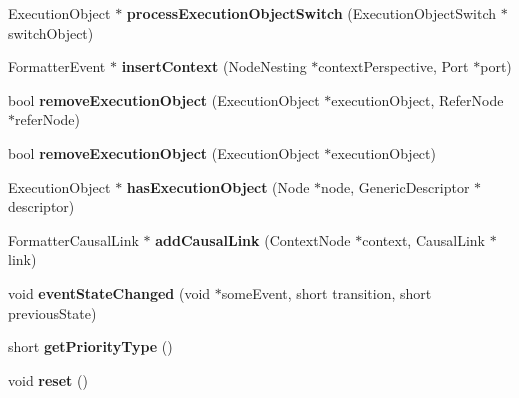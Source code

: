 \begin{CompactItemize}
\item 
ExecutionObject $\ast$ \textbf{processExecutionObjectSwitch} (ExecutionObjectSwitch $\ast$switchObject)\label{classbr_1_1pucrio_1_1telemidia_1_1ginga_1_1ncl_1_1emconverter_1_1FormatterConverter_7266d8edd850ca9ae602ddd7e01e663c}

\item 
FormatterEvent $\ast$ \textbf{insertContext} (NodeNesting $\ast$contextPerspective, Port $\ast$port)\label{classbr_1_1pucrio_1_1telemidia_1_1ginga_1_1ncl_1_1emconverter_1_1FormatterConverter_6542792f04ee69e171c20d9d40a5a04e}

\item 
bool \textbf{removeExecutionObject} (ExecutionObject $\ast$executionObject, ReferNode $\ast$referNode)\label{classbr_1_1pucrio_1_1telemidia_1_1ginga_1_1ncl_1_1emconverter_1_1FormatterConverter_9be863f5cf21361309d32df7de6aa49e}

\item 
bool \textbf{removeExecutionObject} (ExecutionObject $\ast$executionObject)\label{classbr_1_1pucrio_1_1telemidia_1_1ginga_1_1ncl_1_1emconverter_1_1FormatterConverter_efb3c864ce4b4110be243f718dad6228}

\item 
ExecutionObject $\ast$ \textbf{hasExecutionObject} (Node $\ast$node, GenericDescriptor $\ast$descriptor)\label{classbr_1_1pucrio_1_1telemidia_1_1ginga_1_1ncl_1_1emconverter_1_1FormatterConverter_1994a285cccbfa1d720b7d7b50ed3d6e}

\item 
FormatterCausalLink $\ast$ \textbf{addCausalLink} (ContextNode $\ast$context, CausalLink $\ast$link)\label{classbr_1_1pucrio_1_1telemidia_1_1ginga_1_1ncl_1_1emconverter_1_1FormatterConverter_5f5adc424d16c4e9e293bbde440eaca8}

\item 
void \textbf{eventStateChanged} (void $\ast$someEvent, short transition, short previousState)\label{classbr_1_1pucrio_1_1telemidia_1_1ginga_1_1ncl_1_1emconverter_1_1FormatterConverter_e3c1ec29e93bffe641750e6209a8b2b8}

\item 
short \textbf{getPriorityType} ()\label{classbr_1_1pucrio_1_1telemidia_1_1ginga_1_1ncl_1_1emconverter_1_1FormatterConverter_ae7d2f7d0ac4466813deee19bbea7ebe}

\item 
void \textbf{reset} ()\label{classbr_1_1pucrio_1_1telemidia_1_1ginga_1_1ncl_1_1emconverter_1_1FormatterConverter_d20897c5c8bd47f5d4005989bead0e55}

\end{CompactItemize}
